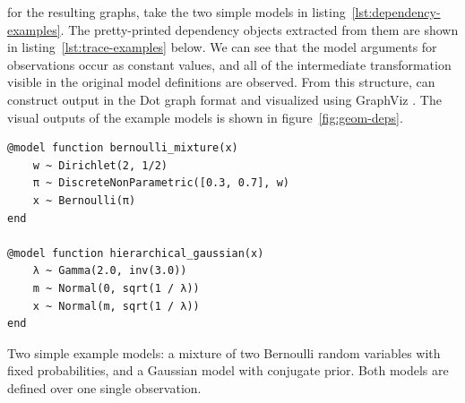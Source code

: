  for the resulting graphs, take the two simple models in
listing~\ref{lst:dependency-examples}.  The pretty-printed dependency  objects
extracted from them are shown in listing~\ref{lst:trace-examples} below.  We can see that the model
arguments for observations occur as constant values, and all of the intermediate transformation
visible in the original model definitions are observed.  From this structure, \autogibbsjl{} can
construct output in the Dot graph format and visualized using GraphViz \parencite{gansner2000open}.
The visual outputs of the example models is shown in figure~\ref{fig:geom-deps}.

\begin{lstfloat}[p]
\begin{lstlisting}[style=lstfloat]
@model function bernoulli_mixture(x)
    w ~ Dirichlet(2, 1/2)
    π ~ DiscreteNonParametric([0.3, 0.7], w)
    x ~ Bernoulli(π)
end

@model function hierarchical_gaussian(x)
    λ ~ Gamma(2.0, inv(3.0))
    m ~ Normal(0, sqrt(1 / λ))
    x ~ Normal(m, sqrt(1 / λ))
end
\end{lstlisting}
  \caption{Two simple example models: a mixture of two Bernoulli random variables with fixed
    probabilities, and a Gaussian model with conjugate prior.  Both models are defined over one
    single observation.}
  \label{lst:dependency-examples}
\end{lstfloat}

